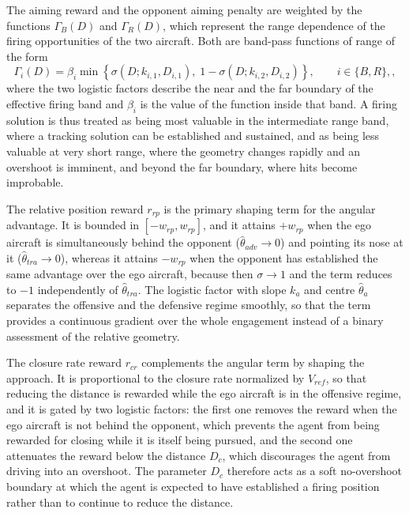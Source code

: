 \documentclass[pdflatex,sn-mathphys-num]{sn-jnl}%
\theoremstyle{thmstyleone}%
\theoremstyle{thmstyletwo}%
\theoremstyle{thmstylethree}%
\begin{document}
The aiming reward and the opponent aiming penalty are weighted by the functions $\Gamma_{B}(D)$ and $\Gamma_{R}(D)$, which represent the range dependence of the firing opportunities of the two aircraft. Both are band-pass functions of range of the form
\begin{equation}
    \Gamma_{i}(D)=\beta_{i}\min\left\{\sigma\left(D;k_{i,1},D_{i,1}\right),\;1-\sigma\left(D;k_{i,2},D_{i,2}\right)\right\},
    \qquad i\in\{B,R\},
    \label{eq:range_weight},
\end{equation}
where the two logistic factors describe the near and the far boundary of the effective firing band and $\beta_{i}$ is the value of the function inside that band. A firing solution is thus treated as being most valuable in the intermediate range band, where a tracking solution can be established and sustained, and as being less valuable at very short range, where the geometry changes rapidly and an overshoot is imminent, and beyond the far boundary, where hits become improbable.

The relative position reward $r_{rp}$ is the primary shaping term for the angular advantage. It is bounded in $[-w_{rp},w_{rp}]$, and it attains $+w_{rp}$ when the ego aircraft is simultaneously behind the opponent ($\hat{\theta}_{adv}\to0$) and pointing its nose at it ($\hat{\theta}_{tra}\to0$), whereas it attains $-w_{rp}$ when the opponent has established the same advantage over the ego aircraft, because then $\sigma\to1$ and the term reduces to $-1$ independently of $\hat{\theta}_{tra}$. The logistic factor with slope $k_{a}$ and centre $\hat{\theta}_{a}$ separates the offensive and the defensive regime smoothly, so that the term provides a continuous gradient over the whole engagement instead of a binary assessment of the relative geometry.

The closure rate reward $r_{cr}$ complements the angular term by shaping the approach. It is proportional to the closure rate normalized by $V_{ref}$, so that reducing the distance is rewarded while the ego aircraft is in the offensive regime, and it is gated by two logistic factors: the first one removes the reward when the ego aircraft is not behind the opponent, which prevents the agent from being rewarded for closing while it is itself being pursued, and the second one attenuates the reward below the distance $D_{c}$, which discourages the agent from driving into an overshoot. The parameter $D_{c}$ therefore acts as a soft no-overshoot boundary at which the agent is expected to have established a firing position rather than to continue to reduce the distance.
\end{document}
